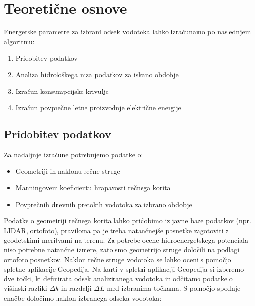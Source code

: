 \chapter{Teoretične osnove}

Energetske parametre za izbrani odsek vodotoka lahko izračunamo po naslednjem algoritmu:
\begin{enumerate}[noitemsep, topsep=0pt]
	\item Pridobitev podatkov
	\item Analiza hidrološkega niza podatkov za iskano obdobje
	\item Izračun konsumpcijske krivulje
	\item Izračun povprečne letne proizvodnje električne energije
\end{enumerate}


\section{Pridobitev podatkov} \label{sec:teorija_pridobitevPodatkov}
Za nadaljnje izračune potrebujemo podatke o:
\begin{itemize}[noitemsep, topsep=0pt]
	\item Geometriji in naklonu rečne struge
	\item Manningovem koeficientu hrapavosti rečnega korita
	\item Povprečnih dnevnih pretokih vodotoka za izbrano obdobje
\end{itemize}


Podatke o geometriji rečnega korita lahko pridobimo iz javne baze podatkov (npr. LIDAR, ortofoto), praviloma pa je treba natančnejše posnetke zagotoviti z geodetskimi meritvami na terenu. Za potrebe ocene hidroenergetskega potenciala niso potrebne natančne izmere, zato smo geometrijo struge določili na podlagi ortofoto posnetkov. Naklon rečne struge vodotoka se lahko oceni s pomočjo spletne aplikacije Geopedija. Na karti v spletni aplikaciji Geopedija si izberemo dve točki, ki definirata odsek analiziranega vodotoka in odčitamo podatke o višinski razliki $\Delta h$ in razdalji $\Delta L$ med izbranima točkama. S pomočjo spodnje enačbe določimo naklon izbranega odseka vodotoka:



